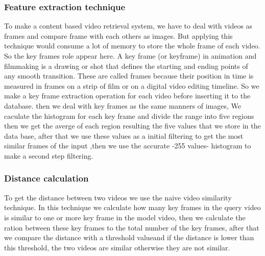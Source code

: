 \subsubsection{Feature extraction technique}
\vskip 0.2in
To make a content based video retrieval system, we have to deal with videos as frames and compare frame with each others as images.
But applying this technique would consume a lot of memory to store the whole frame of each video.
So the key frames role appear here.
\vskip 0.2in
A key frame (or keyframe) in animation and filmmaking is a drawing or shot that defines the starting 
and ending points of any smooth transition. These are called frames because their position in time is measured in 
frames on a strip of film or on a digital video editing timeline.
\vskip 0.2in
So we make a key frame extraction operation for each video before inserting it to the database.
then we deal with key frames as the same manners of images, We caculate the histogram for each key frame and divide the range into 
five regions then we get the averge of each region resulting the five values that we store in the data base, after that we use these values
as a initial filtering to get the most similar frames of the input ,then we use the accurate -255 values- histogram to make a second step filtering.
\vskip 0.2in
\subsubsection{Distance calculation}
To get the distance between two videos we use the naive video similarity technique.
In this technique we calculate how many key frames in the query video is similar to one or more key frame in the model video, then 
we calculate the ration between these key frames to the total number of the key frames, after that we compare the distance with a threshold valueand if the 
distance is lower than this threshold, the two videos are similar otherwise they are not similar.